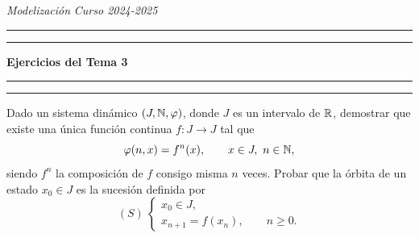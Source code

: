 \documentclass[11pt]{report}
\begin{document}
\noindent \textit{Modelización} \hfill \textit{Curso 2024-2025}

\vspace{-5mm}

\begin{center}

	\rule{\textwidth}{1.6pt}\vspace*{-\baselineskip}\vspace*{2pt} %
	\rule{\textwidth}{0.4pt} %
	
    \vspace{3mm}

	{\LARGE \textbf{Ejercicios del Tema 3}} %

    \vspace{2mm}
	
	\rule[0.66\baselineskip]{\textwidth}{0.4pt}\vspace*{-\baselineskip}\vspace{3.2pt} %
	\rule[0.66\baselineskip]{\textwidth}{1.6pt} %

\end{center}

\begin{exercise}
    Dado un sistema dinámico $(J,\mathbb N,\varphi)$, donde $J$ es un intervalo de $\mathbb R$, demostrar que existe una única función continua $f \colon J \to J$ tal que
    \[\varphi(n,x) = f^n(x), \qquad x \in J, \ n \in \mathbb N,\]
    siendo $f^n$ la composición de $f$ consigo misma $n$ veces. Probar que la órbita de un estado $x_0\in J$ es la sucesión definida por
    \[(S) \ \begin{cases}
        x_0 \in J, \\
        x_{n+1} = f(x_n), \qquad n \geq 0.
    \end{cases}\]
\end{exercise}
\end{document}
